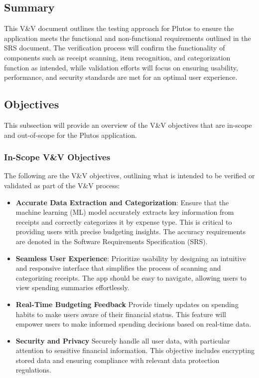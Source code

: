 \documentclass[12pt, titlepage]{article}
\begin{document}
\subsection{Summary}

This V\&V document outlines the testing approach for Plutos to ensure the
application meets the functional and non-functional requirements outlined in the
SRS document. The verification process will confirm the functionality of
components such as receipt scanning, item recognition, and categorization
function as intended, while validation efforts will focus on ensuring usability,
performance, and security standards are met for an optimal user experience.


\subsection{Objectives}

This subsection will provide an overview of the V\&V objectives that are
in-scope and out-of-scope for the Plutos application.

\subsubsection{In-Scope V\&V Objectives}

The following are the V\&V objectives, outlining what is intended to be verified
or validated as part of the V\&V process: 
\begin{itemize}
	\item \textbf{Accurate Data Extraction and Categorization}: Ensure that the
machine learning (ML) model accurately extracts key information from receipts
and correctly categorizes it by expense type. This is critical to providing
users with precise budgeting insights. The accuracy requirements are denoted in
the Software Requirements Specification (SRS).
	\item \textbf{Seamless User Experience}: Prioritize usability by designing
an intuitive and responsive interface that simplifies the process of scanning
and categorizing receipts. The app should be easy to navigate, allowing users to
view spending summaries effortlessly. 
	\item \textbf{Real-Time Budgeting Feedback} Provide timely updates on
spending habits to make users aware of their financial status. This feature will
empower users to make informed spending decisions based on real-time data.
	\item \textbf{Security and Privacy} Securely handle all user data, with
particular attention to sensitive financial information. This objective includes
encrypting stored data and ensuring compliance with relevant data protection
regulations. 
\end{itemize}
\end{document}
